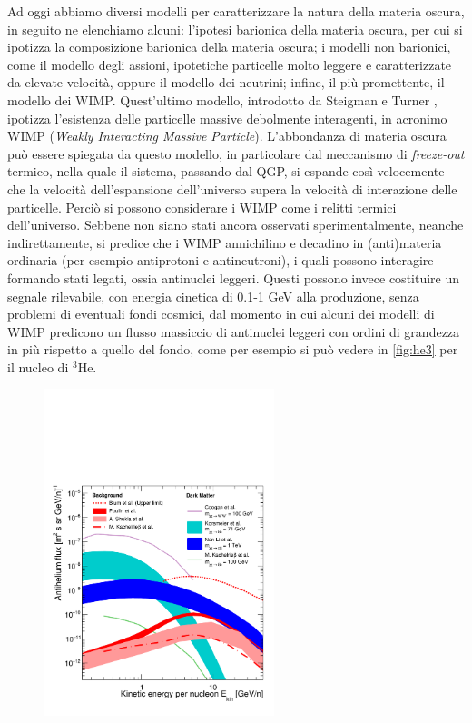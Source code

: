 Ad oggi abbiamo diversi modelli per caratterizzare la natura della materia oscura, in seguito ne elenchiamo alcuni: l'ipotesi barionica della materia oscura, per cui si ipotizza la composizione barionica della materia oscura; i modelli non barionici, come il modello degli assioni, ipotetiche particelle molto leggere e caratterizzate da elevate velocità, oppure il modello dei neutrini; infine, il più promettente, il modello dei WIMP.
Quest'ultimo modello, introdotto da Steigman e Turner \cite{STEIGMAN1985375_wimp}, ipotizza l'esistenza delle particelle massive debolmente interagenti, in acronimo WIMP (\emph{Weakly Interacting Massive Particle}). 
L'abbondanza di materia oscura può essere spiegata da questo modello, in particolare dal meccanismo di \emph{freeze-out} termico, nella quale il sistema, passando dal QGP, si espande così velocemente che la velocità dell'espansione dell'universo supera la velocità di interazione delle particelle.
Perciò si possono considerare i WIMP come i relitti termici dell'universo. 
Sebbene non siano stati ancora osservati sperimentalmente, neanche indirettamente, si predice che i WIMP annichilino e decadino in (anti)materia ordinaria (per esempio antiprotoni e antineutroni), i quali possono interagire formando stati legati, ossia antinuclei leggeri.
Questi possono invece costituire un segnale rilevabile, con energia cinetica di 0.1-1 GeV alla produzione, senza problemi di eventuali fondi cosmici, dal momento in cui alcuni dei modelli di WIMP predicono un flusso massiccio di antinuclei leggeri con ordini di grandezza in più rispetto a quello del fondo, come per esempio si può vedere in \autoref{fig:he3} per il nucleo di $^3\overline{\text{He}}$.
\begin{figure}[htb]
    \centering
    \includegraphics[width=0.6\textwidth]{image/1-alice/He3.pdf}
    \label{fig:he3}
\end{figure}

